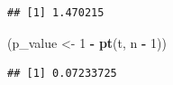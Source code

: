 \documentclass[
]{article}
\newenvironment{Shaded}{\begin{snugshade}}{\end{snugshade}}
\newcommand{\DecValTok}[1]{\textcolor[rgb]{0.00,0.00,0.81}{#1}}
\newcommand{\FunctionTok}[1]{\textcolor[rgb]{0.13,0.29,0.53}{\textbf{#1}}}
\newcommand{\NormalTok}[1]{#1}
\newcommand{\OtherTok}[1]{\textcolor[rgb]{0.56,0.35,0.01}{#1}}
\newcommand{\SpecialCharTok}[1]{\textcolor[rgb]{0.81,0.36,0.00}{\textbf{#1}}}
\begin{document}
\begin{verbatim}
## [1] 1.470215
\end{verbatim}

\begin{Shaded}
\begin{Highlighting}[]
\NormalTok{(p\_value }\OtherTok{\textless{}{-}} \DecValTok{1} \SpecialCharTok{{-}} \FunctionTok{pt}\NormalTok{(t, n }\SpecialCharTok{{-}} \DecValTok{1}\NormalTok{))}
\end{Highlighting}
\end{Shaded}

\begin{verbatim}
## [1] 0.07233725
\end{verbatim}
\end{document}
